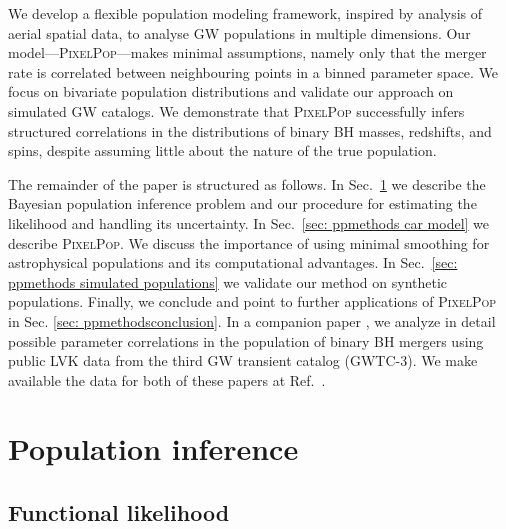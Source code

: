 \begin{refsection}
We develop a flexible population modeling framework, inspired by analysis of aerial spatial data, to analyse GW populations in multiple dimensions. Our model---\textsc{PixelPop}---makes minimal assumptions, namely only that the merger rate is correlated between neighbouring points in a binned parameter space. We focus on bivariate population distributions and validate our approach on simulated GW catalogs. We demonstrate that \textsc{PixelPop} successfully infers structured correlations in the distributions of binary BH masses, redshifts, and spins, despite assuming little about the nature of the true population.

The remainder of the paper is structured as follows. In Sec.~\ref{sec: ppmethods Methods} we describe the Bayesian population inference problem and our procedure for estimating the likelihood and handling its uncertainty. In Sec.~\ref{sec: ppmethods car model} we describe \textsc{PixelPop}. We discuss the importance of using minimal smoothing for astrophysical populations and its computational advantages. In Sec.~\ref{sec: ppmethods simulated populations} we validate our method on synthetic populations. Finally, we conclude and point to further applications of \textsc{PixelPop} in Sec. \ref{sec: ppmethodsconclusion}. In a companion paper \cite{Heinzel:2024hva}, we analyze in detail possible parameter correlations in the population of binary BH mergers using public LVK data from the third GW transient catalog (GWTC-3). We make available the data for both of these papers at Ref.~\cite{heinzel_2024_13176116}.

\section{Population inference}
\label{sec: ppmethods Methods}

\subsection{Functional likelihood}
\label{sec: ppmethods Gravitational wave population likelihood}


\end{refsection}
